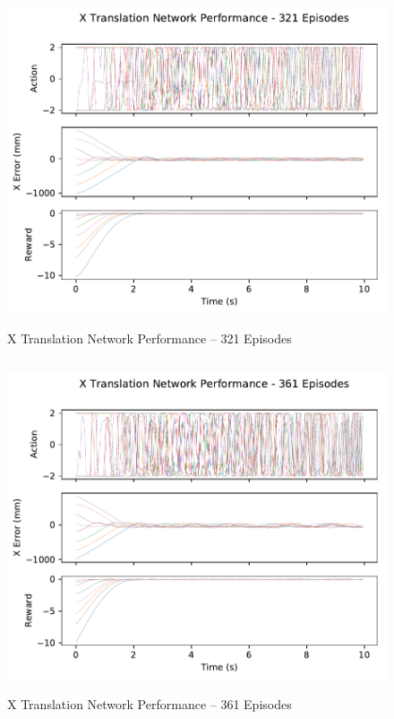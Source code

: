 \begin{figure}[H]
	\centering
	\includegraphics[width=6in, height=3.85in, keepaspectratio]{figures/train_figs/transx_transitions/1_321.pdf}
	\caption{X Translation Network Performance -- 321 Episodes}
\end{figure}
\begin{figure}[H]
	\centering
	\includegraphics[width=6in, height=3.85in, keepaspectratio]{figures/train_figs/transx_transitions/1_361.pdf}
	\caption{X Translation Network Performance -- 361 Episodes}
\end{figure}

